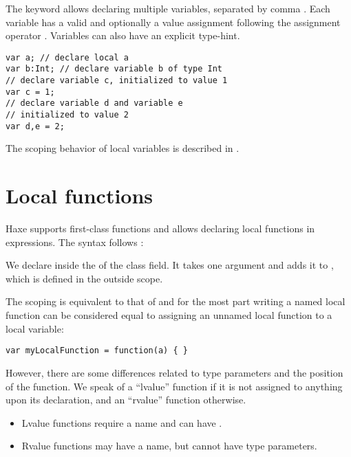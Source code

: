 The  keyword allows declaring multiple variables, separated by comma \expr{,}. Each variable has a valid  and optionally a value assignment following the assignment operator \expr{=}. Variables can also have an explicit type-hint.

\begin{lstlisting}
var a; // declare local a
var b:Int; // declare variable b of type Int
// declare variable c, initialized to value 1
var c = 1;
// declare variable d and variable e
// initialized to value 2
var d,e = 2;
\end{lstlisting}

The scoping behavior of local variables is described in .


\section{Local functions}
\label{expression-function}

Haxe supports first-class functions and allows declaring local functions in expressions. The syntax follows :


We declare  inside the  of the  class field. It takes one argument  and adds it to , which is defined in the outside scope.

The scoping is equivalent to that of  and for the most part writing a named local function can be considered equal to assigning an unnamed local function to a local variable:

\begin{lstlisting}
var myLocalFunction = function(a) { }
\end{lstlisting}

However, there are some differences related to type parameters and the position of the function. We speak of a ``lvalue'' function if it is not assigned to anything upon its declaration, and an ``rvalue'' function otherwise.

\begin{itemize}
	\item Lvalue functions require a name and can have .
	\item Rvalue functions may have a name, but cannot have type parameters.
\end{itemize}


